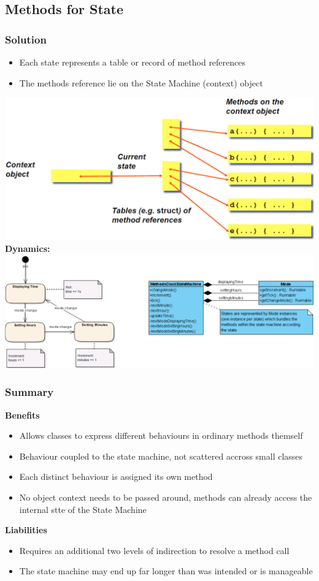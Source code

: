 \subsection{Methods for State}
\subsubsection{Solution}
\begin{itemize}
    \item Each state represents a table or record of method references
    \item The methods reference lie on the State Machine (context) object
\end{itemize}
\includegraphics[width=\linewidth]{./img/method_for_state.png}
\textbf{Dynamics:}\\ 
\includegraphics[width=\linewidth]{./img/method_for_state_dynamic.png}
\subsubsection{Summary}
\textbf{Benefits}
\begin{itemize}
    \item Allows classes to express different behaviours in ordinary methods themself
    \item Behaviour coupled to the state machine, not scattered accross small classes
    \item Each distinct behaviour is assigned its own method
    \item No object context needs to be passed around, methods can already access the internal stte of the State Machine
\end{itemize}
\textbf{Liabilities}
\begin{itemize}
    \item Requires an additional two levels of indirection to resolve a method call
    \item The state machine may end up far longer than was intended or is manageable
\end{itemize}

